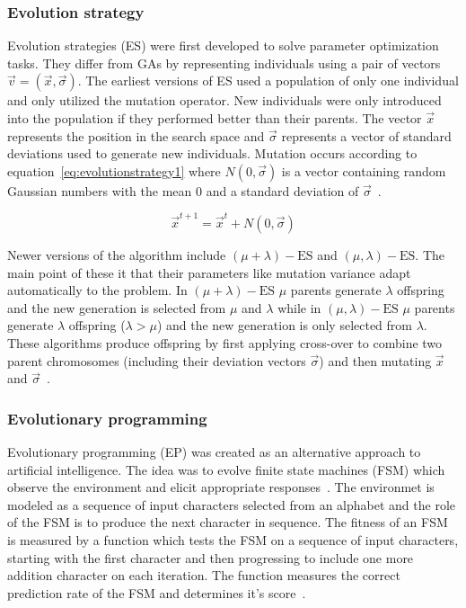 \subsubsection{Evolution strategy}

Evolution strategies (ES) were first developed to solve parameter optimization tasks. They differ from GAs by representing individuals using a pair of vectors $\vec{v} = (\vec{x},\vec{\sigma})$. The earliest versions of ES used a population of only one individual and only utilized the mutation operator. New individuals were only introduced into the population if they performed better than their parents. The vector $\vec{x}$ represents the position in the search space and $\vec{\sigma}$ represents a vector of standard deviations used to generate new individuals. Mutation occurs according to equation~\ref{eq:evolutionstrategy1} where $N(0,\vec{\sigma})$ is a vector containing random Gaussian numbers with the mean $0$ and a standard deviation of $\vec{\sigma}$~\cite{Michalewicz1997}.

\begin{equation}
  \vec{x}^{t+1} =  \vec{x}^{t} + N(0,\vec{\sigma})
  \label{eq:evolutionstrategy1}
\end{equation}

Newer versions of the algorithm include $(\mu + \lambda)-\text{ES}$ and $(\mu,\lambda)-\text{ES}$. The main point of these it that their parameters like mutation variance adapt automatically to the problem. In $(\mu + \lambda)-\text{ES}$ $\mu$ parents generate $\lambda$ offspring and the new generation is selected from $\mu$ and $\lambda$ while in $(\mu,\lambda)-\text{ES}$ $\mu$ parents generate $\lambda$ offspring ($\lambda > \mu$) and the new generation is only selected from $\lambda$. These algorithms produce offspring by first applying cross-over to combine two parent chromosomes (including their deviation vectors $\vec{\sigma}$) and then mutating $\vec{x}$ and $\vec{\sigma}$~\cite{Michalewicz1997}.

\subsubsection{Evolutionary programming}

Evolutionary programming (EP) was created as an alternative approach to artificial intelligence. The idea was to evolve finite state machines (FSM) which observe the environment and elicit appropriate responses~\cite{Fogel1996}. The environmet is modeled as a sequence of input characters selected from an alphabet and the role of the FSM is to produce the next character in sequence. The fitness of an FSM is measured by a function which tests the FSM on a sequence of input characters, starting with the first character and then progressing to include one more addition character on each iteration. The function measures the correct prediction rate of the FSM and determines it's score~\cite{Michalewicz1997}.


